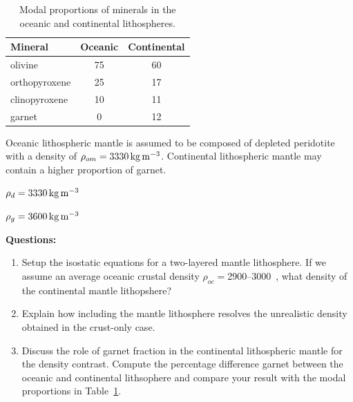 \documentclass[11pt,a4paper]{article}
\begin{document}
\begin{table}[h!]
    \centering
    \caption{Modal proportions of minerals in the oceanic and continental lithospheres.}
    \label{tab:modes}
    \begin{tabular}{lcc}
        \toprule
        \textbf{Mineral} &
        \textbf{Oceanic} &
        \textbf{Continental} \\
        \midrule
        olivine & 75 & 60 \\
        orthopyroxene & 25 & 17 \\
        clinopyroxene & 10 & 11 \\
        garnet & 0 & 12 \\
        \bottomrule
    \end{tabular}
\end{table}
\FloatBarrier

Oceanic lithospheric mantle is assumed to be composed of depleted peridotite with a density of \(\rho_{om} = \SI{3330}{\du}\). Continental lithospheric mantle may contain a higher proportion of garnet.

\begin{description}[itemsep=0.0em, topsep=0.5em]
    \item [Density of depleted mantle (peridotite):] \(\rho_d = \SI{3330}{\du}\)
    \item [Density of garnet:] \(\rho_g = \SI{3600}{\du}\)
\end{description}

\textbf{Questions:}
\begin{enumerate}
    \item Setup the isostatic equations for a two-layered mantle lithosphere.  If we assume an average oceanic crustal density $\rho_{oc} = $2900--3000~\du, what density of the continental mantle lithopshere?

    \item Explain how including the mantle lithosphere resolves the unrealistic density obtained in the crust-only case.

    \item Discuss the role of garnet fraction in the continental lithospheric mantle for the density contrast. Compute the percentage difference garnet between the oceanic and continental lithsophere and compare your result with the modal proportions in Table~\ref{tab:modes}.
\end{enumerate}
\end{document}
